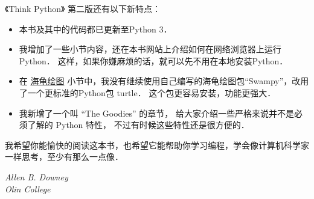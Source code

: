 
《Think Python》 第二版还有以下新特点：

\begin{itemize}

\item 本书及其中的代码都已更新至Python 3．

\item 我增加了一些小节内容，还在本书网站上介绍如何在网络浏览器上运行Python． 这样，如果你嫌麻烦的话，就可以先不用在本地安装Python．

\item 在 \hyperref[turtle]{海龟绘图} 小节中，我没有继续使用自己编写的海龟绘图包``Swampy''，改用了一个更标准的Python包 turtle． 这个包更容易安装，功能更强大．

\item 我新增了一个叫 ``The Goodies'' 的章节， 给大家介绍一些严格来说并不是必须了解的 Python 特性， 不过有时候这些特性还是很方便的．

\end{itemize}


我希望你能愉快的阅读这本书，也希望它能帮助你学习编程，学会像计算机科学家一样思考，至少有那么一点像．

{\em Allen B. Downey} \\

{\em Olin College} \\


